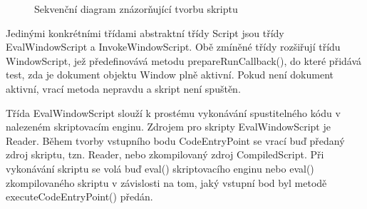 \begin{figure}[H]
  \begin{center}
    \caption{Sekvenční diagram znázorňující tvorbu skriptu}
    \label{Figure.CreateScript}
  \end{center}
\end{figure}

Jedinými konkrétními třídami abstraktní třídy Script jsou třídy EvalWindowScript a InvokeWindowScript. Obě zmíněné třídy rozšiřují třídu WindowScript, jež předefinovává metodu prepareRunCallback(), do které přidává test, zda je dokument objektu Window plně aktivní. Pokud není dokument aktivní, vrací metoda nepravdu a skript není spuštěn.

Třída EvalWindowScript slouží k prostému vykonávání spustitelného kódu v nalezeném skriptovacím enginu. Zdrojem pro skripty EvalWindowScript je Reader. Během tvorby vstupního bodu CodeEntryPoint se vrací buď předaný zdroj skriptu, tzn. Reader, nebo zkompilovaný zdroj CompiledScript. Při vykonávání skriptu se volá buď eval() skriptovacího enginu nebo eval() zkompilovaného skriptu v závislosti na tom, jaký vstupní bod byl metodě executeCodeEntryPoint() předán.

